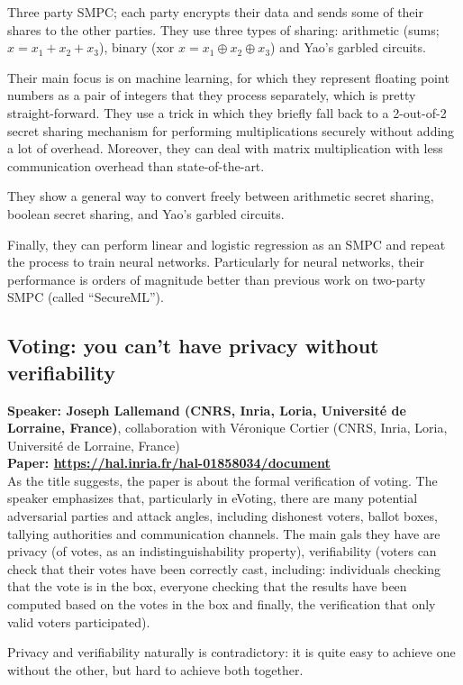 \documentclass{article}
\begin{document}
Three party SMPC; each party encrypts their data and sends some of their shares to the other parties. 
They use three types of sharing: arithmetic (sums; $x = x_1 + x_2 + x_3$), binary (xor $x = x_1 \oplus x_2 \oplus x_3$) and Yao's garbled circuits.


Their main focus is on machine learning, for which they represent floating point numbers as a pair of integers that they process separately, which is pretty straight-forward.
They use a trick in which they briefly fall back to a 2-out-of-2 secret sharing mechanism for performing multiplications securely without adding a lot of overhead. Moreover, they can deal with matrix multiplication with less communication overhead than state-of-the-art.

They show a general way to convert freely between arithmetic secret sharing, boolean secret sharing, and Yao's garbled circuits.

Finally, they can perform linear and logistic regression as an SMPC and repeat the process to train neural networks. Particularly for neural networks, their performance is orders of magnitude better than previous work on two-party SMPC (called ``SecureML'').

\subsection{Voting: you can’t have privacy without verifiability}
\noindent\textbf{Speaker: Joseph Lallemand (CNRS, Inria, Loria, Université de Lorraine, France)}, collaboration with Véronique Cortier (CNRS, Inria, Loria, Université de Lorraine, France)\\
\noindent\textbf{Paper: \url{https://hal.inria.fr/hal-01858034/document}}\\

As the title suggests, the paper is about the formal verification of voting.
The speaker emphasizes that, particularly in eVoting, there are many potential adversarial parties and attack angles, including dishonest voters, ballot boxes, tallying authorities and communication channels. The main gals they have are privacy (of votes, as an indistinguishability property), verifiability (voters can check that their votes have been correctly cast, including: individuals checking that the vote is in the box, everyone checking that the results have been computed based on the votes in the box and finally, the verification that only valid voters participated).

Privacy and verifiability naturally is contradictory: it is quite easy to achieve one without the other, but hard to achieve both together.
\end{document}
